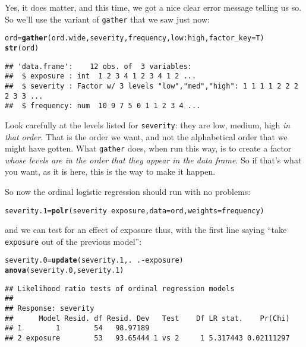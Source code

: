 \documentclass{article}\usepackage[]{graphicx}\usepackage[]{color}
\makeatletter
\newcommand{\hlopt}[1]{\textcolor[rgb]{0,0,0}{#1}}%
\newcommand{\hlstd}[1]{\textcolor[rgb]{0.345,0.345,0.345}{#1}}%
\newcommand{\hlkwb}[1]{\textcolor[rgb]{0.69,0.353,0.396}{#1}}%
\newcommand{\hlkwc}[1]{\textcolor[rgb]{0.333,0.667,0.333}{#1}}%
\newcommand{\hlkwd}[1]{\textcolor[rgb]{0.737,0.353,0.396}{\textbf{#1}}}%
\newenvironment{kframe}{%
 \def\at@end@of@kframe{}%
 \ifinner\ifhmode%
  \def\at@end@of@kframe{\end{minipage}}%
  \begin{minipage}{\columnwidth}%
 \fi\fi%
 \def\FrameCommand##1{\hskip\@totalleftmargin \hskip-\fboxsep
 \colorbox{shadecolor}{##1}\hskip-\fboxsep
     \hskip-\linewidth \hskip-\@totalleftmargin \hskip\columnwidth}%
 \MakeFramed {\advance\hsize-\width
   \@totalleftmargin\z@ \linewidth\hsize
   \@setminipage}}%
 {\par\unskip\endMakeFramed%
 \at@end@of@kframe}
\newenvironment{knitrout}{}{} %
\makeatother
\begin{document}
Yes, it does matter, and this time, we got a nice clear error message
telling us so. So we'll use the variant of \texttt{gather} that
we saw just now:

\begin{knitrout}
\color{fgcolor}\begin{kframe}
\begin{alltt}
\hlstd{ord}\hlkwb{=}\hlkwd{gather}\hlstd{(ord.wide,severity,frequency,low}\hlopt{:}\hlstd{high,}\hlkwc{factor_key}\hlstd{=T)}
\hlkwd{str}\hlstd{(ord)}
\end{alltt}
\begin{verbatim}
## 'data.frame':	12 obs. of  3 variables:
##  $ exposure : int  1 2 3 4 1 2 3 4 1 2 ...
##  $ severity : Factor w/ 3 levels "low","med","high": 1 1 1 1 2 2 2 2 3 3 ...
##  $ frequency: num  10 9 7 5 0 1 1 2 3 4 ...
\end{verbatim}
\end{kframe}
\end{knitrout}

Look carefully at the levels listed for \texttt{severity}: they are
low, medium, high \emph{in that order}. That is the order we want,
and not the alphabetical order that we might have gotten. What
\texttt{gather} does, when run this way, is to create a factor
\emph{whose levels are in the order that they appear in the data
  frame}. So if that's what you want, as it is here, this is the way
to make it happen.

So now the ordinal logistic regression should run with no problems:

\begin{knitrout}
\color{fgcolor}\begin{kframe}
\begin{alltt}
\hlstd{severity.1}\hlkwb{=}\hlkwd{polr}\hlstd{(severity}\hlopt{~}\hlstd{exposure,}\hlkwc{data}\hlstd{=ord,}\hlkwc{weights}\hlstd{=frequency)}
\end{alltt}
\end{kframe}
\end{knitrout}
and we can test for an effect of exposure thus, with the first line
saying ``take \texttt{exposure} out of the previous model'':

\begin{knitrout}
\color{fgcolor}\begin{kframe}
\begin{alltt}
\hlstd{severity.0}\hlkwb{=}\hlkwd{update}\hlstd{(severity.1,.}\hlopt{~}\hlstd{.}\hlopt{-}\hlstd{exposure)}
\hlkwd{anova}\hlstd{(severity.0,severity.1)}
\end{alltt}
\begin{verbatim}
## Likelihood ratio tests of ordinal regression models
## 
## Response: severity
##      Model Resid. df Resid. Dev   Test    Df LR stat.    Pr(Chi)
## 1        1        54   98.97189                                 
## 2 exposure        53   93.65444 1 vs 2     1 5.317443 0.02111297
\end{verbatim}
\end{kframe}
\end{knitrout}
\end{document}
